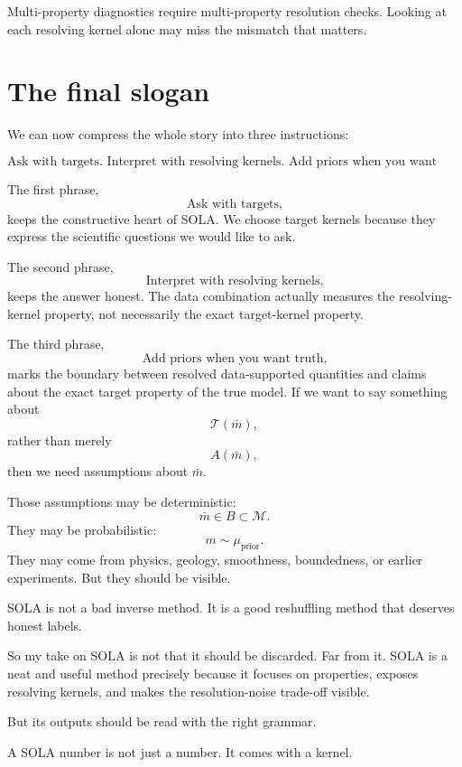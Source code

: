 \documentclass[11pt,openany]{book}
\theoremstyle{definition}
\theoremstyle{remark}
\newcommand{\M}{\mathcal M}
\newcommand{\Tau}{\mathcal{T}}
\begin{document}
\begin{lessonbox}
Multi-property diagnostics require multi-property resolution checks. Looking at each resolving
kernel alone may miss the mismatch that matters.
\end{lessonbox}

\section{The final slogan}

We can now compress the whole story into three instructions:

\[
  \boxed{
    \text{Ask with targets. Interpret with resolving kernels. Add priors when you want truth.}
  }
\]

The first phrase,
\[
  \text{Ask with targets,}
\]
keeps the constructive heart of SOLA. We choose target kernels because they express the
scientific questions we would like to ask.

The second phrase,
\[
  \text{Interpret with resolving kernels,}
\]
keeps the answer honest. The data combination actually measures the resolving-kernel property,
not necessarily the exact target-kernel property.

The third phrase,
\[
  \text{Add priors when you want truth,}
\]
marks the boundary between resolved data-supported quantities and claims about the exact
target property of the true model. If we want to say something about
\[
  \Tau(\bar m),
\]
rather than merely
\[
  A(\bar m),
\]
then we need assumptions about \(\bar m\).

Those assumptions may be deterministic:
\[
  \bar m\in B\subset\M.
\]
They may be probabilistic:
\[
  m\sim\mu_{\mathrm{prior}}.
\]
They may come from physics, geology, smoothness, boundedness, or earlier experiments. But
they should be visible.

\begin{lessonbox}
SOLA is not a bad inverse method. It is a good reshuffling method that deserves honest labels.
\end{lessonbox}

So my take on SOLA is not that it should be discarded. Far from it. SOLA is a neat and useful
method precisely because it focuses on properties, exposes resolving kernels, and makes the
resolution-noise trade-off visible.

But its outputs should be read with the right grammar.

A SOLA number is not just a number. It comes with a kernel.
\end{document}
